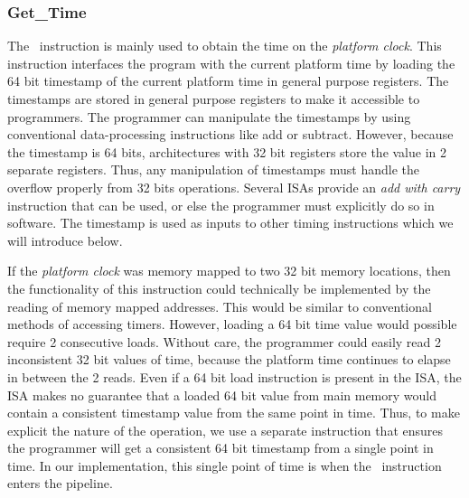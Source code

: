\subsubsection{Get\_Time}
The \gettime\ instruction is mainly used to obtain the time on the \emph{platform clock}.
This instruction interfaces the program with the current platform time by loading the 64 bit timestamp of the current platform time in general purpose registers. 
The timestamps are stored in general purpose registers to make it accessible to programmers. 
The programmer can manipulate the timestamps by using conventional data-processing instructions like add or subtract.
However, because the timestamp is 64 bits, architectures with 32 bit registers store the value in 2 separate registers. 
Thus, any manipulation of timestamps must handle the overflow  properly from 32 bits operations. 
Several ISAs provide an \emph{add with carry} instruction that can be used, or else the programmer must explicitly do so in software.
The timestamp is used as inputs to other timing instructions which we will introduce below.   

If the \emph{platform clock} was memory mapped to two 32 bit memory locations, then the functionality of this instruction could technically be implemented by the reading of memory mapped addresses. 
This would be similar to conventional methods of accessing timers. 
However, loading a 64 bit time value would possible require 2 consecutive loads.
Without care, the programmer could easily read 2 inconsistent 32 bit values of time, because the platform time continues to elapse in between the 2 reads.     
Even if a 64 bit load instruction is present in the ISA, the ISA makes no guarantee that a loaded 64 bit value from main memory would contain a consistent timestamp value from the same point in time. 
Thus, to make explicit the nature of the operation, we use a separate instruction that ensures the programmer will get a consistent 64 bit timestamp from a single point in time.    
In our implementation, this single point of time is when the \gettime\ instruction enters the pipeline.

